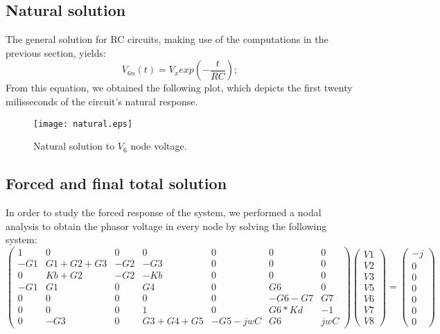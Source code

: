 \subsection{Natural solution}
The general solution for RC circuits, making use of the computations in the previous section, yields:
\begin{equation}
V_{6n}(t)=V_xexp(-\frac{t}{RC});
\end{equation}
From this equation, we obtained the following plot, which depicts the first twenty milisseconds of the circuit's natural response.
\begin{figure}[h] \centering
\texttt{[image: natural.eps]}
\caption{Natural solution to $V_{6}$ node voltage.}
\label{fig:current}
\end{figure}

\subsection{Forced and final total solution}
In order to study the forced response of the system, we performed a nodal analysis to obtain the phasor voltage in every node by solving the following system:
\begin{equation}
\begin{pmatrix}
1 & 0 & 0 & 0 & 0 & 0 & 0\\
-G1 & G1+G2+G3 & -G2 & -G3 & 0 & 0 & 0\\
0 & Kb+G2 & -G2 & -Kb & 0 & 0 & 0\\
-G1 & G1 & 0 & G4 & 0 & G6 & 0\\
0 & 0 & 0 & 0 & 0 & -G6-G7 & G7\\
0 & 0 & 0 & 1 & 0 & G6*Kd & -1\\
0 & -G3 & 0 & G3+G4+G5 & -G5-jwC & G6 & jwC
\end{pmatrix}
\begin{pmatrix}
V1\\
V2\\
V3\\
V5\\
V6\\
V7\\
V8
\end{pmatrix}
=
\begin{pmatrix}
-j\\
0\\
0\\
0\\
0\\
0\\
0
\end{pmatrix}
\end{equation}

